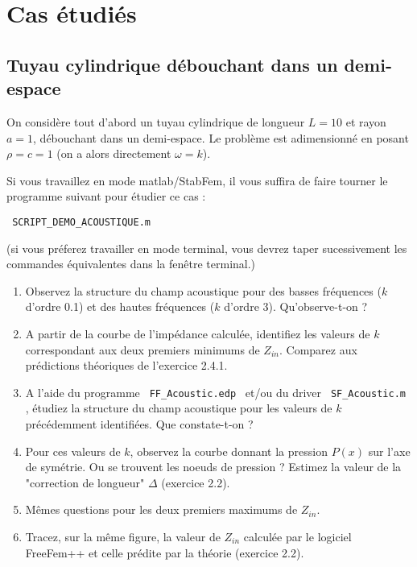\documentclass[11pt,a4paper]{article}
\begin{document}
\section{  Cas étudiés }

\subsection{Tuyau cylindrique débouchant dans un demi-espace}

On considère tout d'abord un tuyau cylindrique de longueur $L=10$ et rayon $a = 1$, 
débouchant dans un demi-espace. Le problème est adimensionné en posant $\rho = c =1$ 
(on a alors directement $\omega = k$).

Si vous travaillez en mode matlab/StabFem, il vous suffira de faire tourner le programme suivant pour étudier ce cas :

\verb| SCRIPT_DEMO_ACOUSTIQUE.m |

{\small
(si vous préferez travailler en mode terminal, vous devrez taper sucessivement les commandes équivalentes dans la fenêtre terminal.)
}

\begin{enumerate}

\item Observez la structure du champ acoustique pour des basses fréquences ($k$ d'ordre 0.1) et des hautes fréquences ($k$ d'ordre 3). Qu'observe-t-on ?


\item A partir de la courbe de l'impédance calculée, identifiez les valeurs de $k$ correspondant aux deux premiers minimums de $Z_{in}$. Comparez aux prédictions théoriques de l'exercice 2.4.1.

\item A l'aide du programme \verb| FF_Acoustic.edp | et/ou du driver \verb| SF_Acoustic.m |,
étudiez la structure du champ acoustique pour les valeurs de $k$ précédemment identifiées. Que constate-t-on ?

\item Pour ces  valeurs de $k$, observez la courbe donnant la pression $P(x)$ sur l'axe de symétrie. Ou se trouvent les noeuds de pression ? Estimez la valeur de la "correction de longueur" $\Delta$ (exercice 2.2).

\item Mêmes questions pour les deux premiers maximums de $Z_{in}$. 


\item Tracez, sur la même figure, la valeur de $Z_{in}$ calculée par le logiciel FreeFem++ et celle prédite par la théorie (exercice 2.2).

\end{enumerate}
\end{document}
